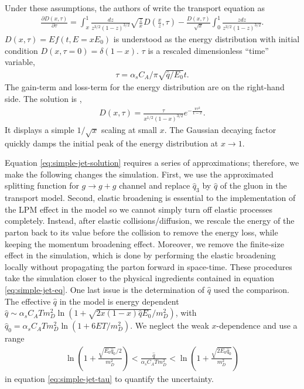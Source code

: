 Under these assumptions, the authors of \cite{Blaizot:2013hx} write the transport equation as 
\begin{eqnarray}
\frac{\partial D(x, \tau)}{\partial \tau} = \int_x^1 \frac{dz}{z^{3/2}(1-z)^{3/2}} \sqrt{\frac{z}{x}} D\left(\frac{x}{z},\tau\right) -  \frac{D(x, \tau)}{\sqrt{x}}\int_0^1 \frac{z dz}{z^{3/2}(1-z)^{3/2}}.
\label{eq:simple-jet-eq}
\end{eqnarray}
$D(x, \tau) = E f(t, E=xE_0)$ is understood as the energy distribution with initial condition $D(x, \tau=0) = \delta(1-x)$.
$\tau$ is a rescaled dimensionless ``time'' variable,
\begin{eqnarray}
\tau = \alpha_s C_A/\pi \sqrt{\hat{q}/E_0} t.
\label{eq:simple-jet-tau}
\end{eqnarray}
The gain-term and loss-term for the energy distribution are on the right-hand side.
The solution is \cite{Blaizot:2013hx},
\begin{eqnarray}
D(x, \tau) = \frac{\tau}{x^{1/2}(1-x)^{3/2}}e^{-\frac{\pi \tau^2}{1-x}}.
\label{eq:simple-jet-solution}
\end{eqnarray}
It displays a simple $1/\sqrt{x}$ scaling at small $x$.
The Gaussian decaying factor quickly damps the initial peak of the energy distribution at $x\rightarrow 1$.

Equation \ref{eq:simple-jet-solution} requires a series of approximations; therefore, we make the following changes the simulation.
First, we use the approximated splitting function for $g\rightarrow g+g$ channel and replace $\hat{q}_3$ by $\hat{q}$ of the gluon in the transport model. 
Second, elastic broadening is essential to the implementation of the LPM effect in the model so we cannot simply turn off elastic processes completely. 
Instead, after elastic collisions/diffusion, we rescale the energy of the parton back to its value before the collision to remove the energy loss, while keeping the momentum broadening effect.
Moreover, we remove the finite-size effect in the simulation, which is done by performing the elastic broadening locally without propagating the parton forward in space-time.
These procedures take the simulation closer to the physical ingredients contained in equation \ref{eq:simple-jet-eq}.
One last issue is the determination of $\hat{q}$ used the comparison. The effective $\hat{q}$ in the model is energy dependent $\hat{q} \sim  \alpha_s C_A T m_D^2\ln(1+\sqrt{2x(1-x)\hat{q}E_0}/m_D^2)$, with $\hat{q}_0 = \alpha_s C_A T m_D^2\ln(1+6ET/m_D^2)$.
We neglect the weak $x$-dependence and use a range
\begin{eqnarray}
\ln\left(
1+\frac{\sqrt{E_0\hat{q}_0}/2}{m_D^2}
\right) < \frac{\hat{q}}{\alpha_s C_A T m_D^2} < 
\ln\left(
1+\frac{\sqrt{2 E_0\hat{q}_0}}{m_D^2}
\right)
\end{eqnarray}
in equation \ref{eq:simple-jet-tau} to quantify the uncertainty.

